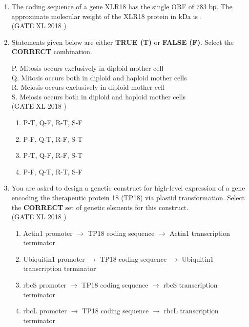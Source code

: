 \documentclass[14pt]{extarticle}
\begin{document}
\begin{flushleft}
\begin{enumerate}[leftmargin=*]
    \item The coding sequence of a gene XLR18 has the single ORF of 783 bp. The approximate molecular weight of the XLR18 protein in kDa is \underline{\hspace{3cm}}.\\
    \hfill(GATE XL 2018 )

    \item Statements given below are either \textbf{TRUE (T)} or \textbf{FALSE (F)}. Select the \textbf{CORRECT} combination.  

    P. Mitosis occurs exclusively in diploid mother cell \\
    Q. Mitosis occurs both in diploid and haploid mother cells \\
    R. Meiosis occurs exclusively in diploid mother cell \\
    S. Meiosis occurs both in diploid and haploid mother cells\\
    \hfill(GATE XL 2018 )
    \begin{multicols}{2}
    \begin{enumerate}
        \item P-T, Q-F, R-T, S-F
        \item P-F, Q-T, R-F, S-T
        \item P-T, Q-F, R-F, S-T
        \item P-F, Q-T, R-T, S-F
    \end{enumerate}
    \end{multicols}

    \item You are asked to design a genetic construct for high-level expression of a gene encoding the therapeutic protein 18 (TP18) via plastid transformation. Select the \textbf{CORRECT} set of genetic elements for this construct.\\
 \hfill(GATE XL 2018 )   
    \begin{enumerate}
        \item Actin1 promoter $\rightarrow$ TP18 coding sequence $\rightarrow$ Actin1 transcription terminator
        \item Ubiquitin1 promoter $\rightarrow$ TP18 coding sequence $\rightarrow$ Ubiquitin1 transcription terminator
        \item rbcS promoter $\rightarrow$ TP18 coding sequence $\rightarrow$ rbcS transcription terminator
        \item rbcL promoter $\rightarrow$ TP18 coding sequence $\rightarrow$ rbcL transcription terminator
    \end{enumerate}
    


\end{enumerate}
\end{flushleft}
\end{document}
